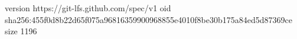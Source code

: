 version https://git-lfs.github.com/spec/v1
oid sha256:455f0d8b22d65f075a96816359900968855e4010f8be30b175a84ed5d87369ce
size 1196
